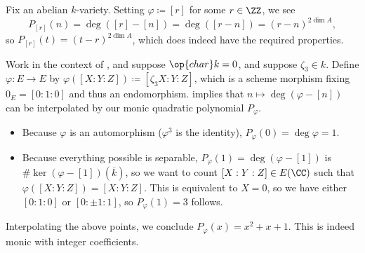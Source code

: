 \documentclass{amsart}
\begin{document}
\begin{example}
	Fix an abelian $k$-variety. Setting $\varphi\coloneqq[r]$ for some $r\in\ZZ$, we see
	\[P_{[r]}(n)=\deg([r]-[n])=\deg([r-n])=(r-n)^{2\dim A},\]
	so $P_{[r]}(t)=(t-r)^{2\dim A}$, which does indeed have the required properties.
\end{example}
\begin{example} \label{ex:ec-use-nontrivial-aut}
	Work in the context of , and suppose $\op{char}k=0$, and suppose $\zeta_3\in k$. Define $\varphi\colon E\to E$ by $\varphi([X:Y:Z])\coloneqq\left[\zeta_3X:Y:Z\right]$, which is a scheme morphism fixing $0_E=[0:1:0]$ and thus an endomorphism.  implies that $n\mapsto\deg(\varphi-[n])$ can be interpolated by our monic quadratic polynomial $P_\varphi$.
	\begin{itemize}
		\item Because $\varphi$ is an automorphism ($\varphi^3$ is the identity), $P_\varphi(0)=\deg\varphi=1$.
		\item Because everything possible is separable, $P_\varphi(1)=\deg(\varphi-[1])$ is $\#\ker(\varphi-[1])(\overline k)$, so we want to count $[X:Y:Z]\in E(\CC)$ such that $\varphi([X:Y:Z])=[X:Y:Z]$. This is equivalent to $X=0$, so we have either $[0:1:0]$ or $[0:\pm1:1]$, so $P_\varphi(1)=3$ follows.
	\end{itemize}
	Interpolating the above points, we conclude $P_\varphi(x)=x^2+x+1$. This is indeed monic with integer coefficients.
\end{example}
\end{document}
